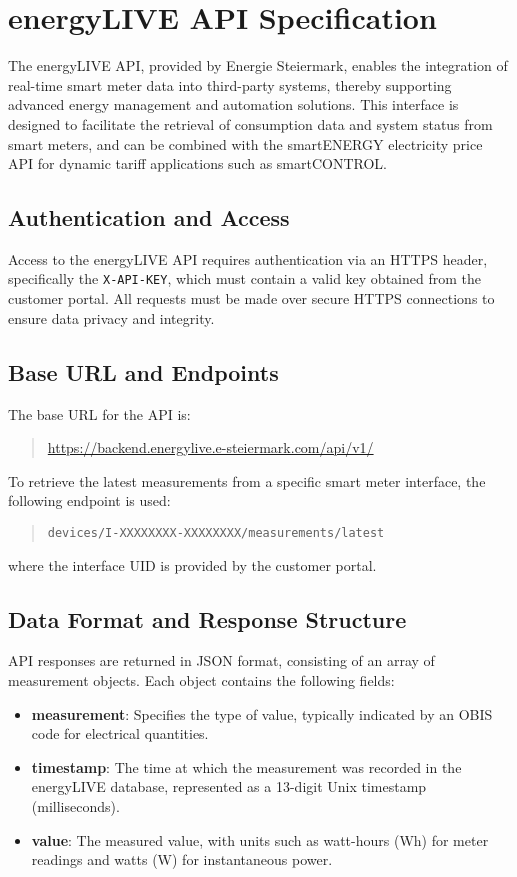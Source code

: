 \newpage
\section{energyLIVE API Specification}
\label{appendix:energylive-api}

The energyLIVE API, provided by Energie Steiermark, enables the integration of real-time smart meter data into third-party systems, thereby supporting advanced energy management and automation solutions. This interface is designed to facilitate the retrieval of consumption data and system status from smart meters, and can be combined with the smartENERGY electricity price API for dynamic tariff applications such as smartCONTROL.

\subsection{Authentication and Access}
Access to the energyLIVE API requires authentication via an HTTPS header, specifically the \texttt{X-API-KEY}, which must contain a valid key obtained from the customer portal. All requests must be made over secure HTTPS connections to ensure data privacy and integrity.

\subsection{Base URL and Endpoints}
The base URL for the API is:
\begin{quote}
    \url{https://backend.energylive.e-steiermark.com/api/v1/}
\end{quote}
To retrieve the latest measurements from a specific smart meter interface, the following endpoint is used:
\begin{quote}
    \texttt{devices/I-XXXXXXXX-XXXXXXXX/measurements/latest}
\end{quote}
where the interface UID is provided by the customer portal.

\subsection{Data Format and Response Structure}
API responses are returned in JSON format, consisting of an array of measurement objects. Each object contains the following fields:
\begin{itemize}
    \item \textbf{measurement}: Specifies the type of value, typically indicated by an OBIS code for electrical quantities.
    \item \textbf{timestamp}: The time at which the measurement was recorded in the energyLIVE database, represented as a 13-digit Unix timestamp (milliseconds).
    \item \textbf{value}: The measured value, with units such as watt-hours (Wh) for meter readings and watts (W) for instantaneous power.
\end{itemize}

